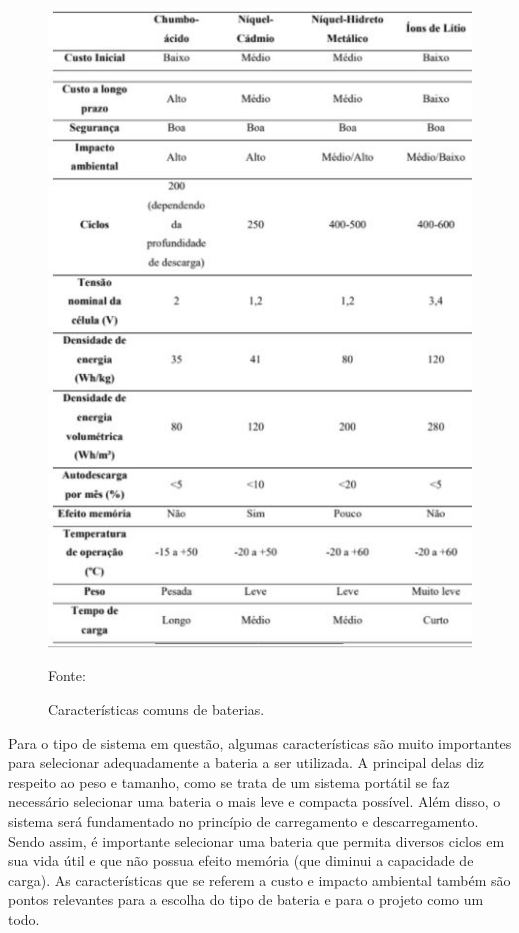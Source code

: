 \begin{figure}[!h]
	\centering
	\label{tipo de bateria}
		\includegraphics[keepaspectratio=true,scale=1]{figuras/Tabela_comparação_baterias.JPG}
	\caption{Características comuns de baterias.}
	{\footnotesize Fonte: \cite{artigo_bateria}}
	\label{fig:tipos baterias}
\end{figure}

Para o tipo de sistema em questão, algumas características são muito importantes para selecionar adequadamente a bateria a ser utilizada. A principal delas diz respeito ao peso e tamanho, como se trata de um sistema portátil se faz necessário selecionar uma bateria o mais leve e compacta possível. Além disso, o sistema será fundamentado no princípio de carregamento e descarregamento. Sendo assim, é importante selecionar uma bateria que permita diversos ciclos em sua vida útil e que não possua efeito memória (que diminui a capacidade de carga). As características que se referem a custo e impacto ambiental também são pontos relevantes para a escolha do tipo de bateria e para o projeto como um todo.

